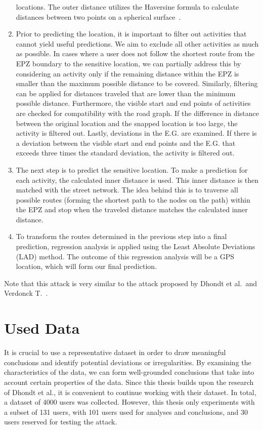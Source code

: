 \documentclass[conference]{IEEEtran}
\begin{document}
\begin{enumerate}
          locations. The outer distance utilizes the Haversine formula to calculate
          distances between two points on a spherical
          surface~\cite{sheppard1922practical}.
    \item Prior to predicting the location, it is important to filter out activities that
          cannot yield useful predictions. We aim to exclude all other activities as much
          as possible. In cases where a user does not follow the shortest route from the
          EPZ boundary to the sensitive location, we can partially address this by
          considering an activity only if the remaining distance within the EPZ is
          smaller than the maximum possible distance to be covered. Similarly, filtering
          can be applied for distances traveled that are lower than the minimum possible
          distance. Furthermore, the visible start and end points of activities are
          checked for compatibility with the road graph. If the difference in distance
          between the original location and the snapped location is too large, the
          activity is filtered out. Lastly, deviations in the E.G. are examined. If there
          is a deviation between the visible start and end points and the E.G. that
          exceeds three times the standard deviation, the activity is filtered out.
    \item The next step is to predict the sensitive location. To make a prediction for
          each activity, the calculated inner distance is used. This inner distance is
          then matched with the street network. The idea behind this is to traverse all
          possible routes (forming the shortest path to the nodes on the path) within the
          EPZ and stop when the traveled distance matches the calculated inner distance.
    \item To transform the routes determined in the previous step into a final
          prediction, regression analysis is applied using the Least Absolute Deviations
          (LAD) method. The outcome of this regression analysis will be a GPS location,
          which will form our final prediction.
\end{enumerate}
Note that this attack is very similar to the attack proposed by Dhondt et al.\ and Verdonck T.~\cite{Dhondt,Verdonck_2022}.

\section{\textbf{Used Data}}
It is crucial to use a representative dataset in order to draw meaningful
conclusions and identify potential deviations or irregularities. By examining
the characteristics of the data, we can form well-grounded conclusions that
take into account certain properties of the data. Since this thesis builds upon
the research of Dhondt et al., it is convenient to continue working with their
dataset. In total, a dataset of 4000 users was collected. However, this thesis
only experiments with a subset of 131 users, with 101 users used for analyses
and conclusions, and 30 users reserved for testing the attack.
\end{document}
